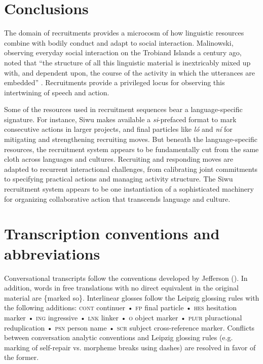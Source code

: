 \documentclass[output=paper]{langsci/langscibook}
\begin{document}
\section{Conclusions}

The domain of recruitments provides a microcosm of how linguistic resources combine with bodily conduct and adapt to social interaction. Malinowski, observing everyday social interaction on the Trobiand Islands a century ago, noted that “the structure of all this linguistic material is inextricably mixed up with, and dependent upon, the course of the activity in which the utterances are embedded” \citep[311]{malinowski_problem_1923}. Recruitments provide a privileged locus for observing this intertwining of speech and action.

Some of the resources used in recruitment sequences bear a language-specific signature. For instance, Siwu makes available a \textit{si}-prefaced format to mark consecutive actions in larger projects, and final particles like \textit{ló} and \textit{ní} for mitigating and strengthening recruiting moves.  But beneath the language-specific resources, the recruitment system appears to be fundamentally cut from the same cloth across languages and cultures. Recruiting and responding moves are adapted to recurrent interactional challenges, from calibrating joint commitments to specifying practical actions and managing activity structure. The Siwu recruitment system appears to be one instantiation of a sophisticated machinery for organizing collaborative action that transcends language and culture.

\section*{Transcription conventions and abbreviations}

Conversational transcripts follow the conventions developed by Jefferson (\citeyear{jefferson_glossary_2004}). In addition, words in free translations with no direct equivalent in the original material are \{marked so\}. Interlinear glosses follow the Leipzig glossing rules \citep{comrie_leipzig_2020} with the following additions: \textsc{cont} continuer • \textsc{fp} final particle •
\textsc{hes} hesitation marker •
\textsc{ing} ingressive •
\textsc{lnk} linker •
\textsc{o} object marker •
\textsc{plur} pluractional reduplication •
\textsc{psn} person name •
\textsc{scr} subject cross-reference marker.
Conflicts between conversation analytic conventions and Leipzig glossing rules (e.g. marking of self-repair vs. morpheme breaks using dashes) are resolved in favor of the former.
\end{document}
